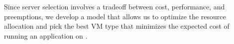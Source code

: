 Since server selection involves a tradeoff between cost, performance, and preemptions, we develop a model that allows us to optimize the resource allocation and pick the best VM type that minimizes the expected cost of running an application on \sysname. 






